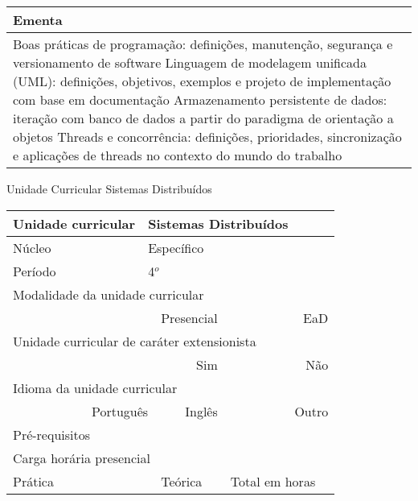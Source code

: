 \begin{quadro}[ht!]
\begin{tabular}{|p{3cm} p{2cm} p{3cm} p{2cm} p{3cm} p{2cm}|}
\multicolumn{6}{|p{15cm}|}{\cellcolor{blue1} Ementa} \\\hline
\hline\multicolumn{6}{|p{15cm}|}{\scriptsize Boas práticas de programação: definições, manutenção, segurança e versionamento de software Linguagem de modelagem unificada (UML): definições, objetivos, exemplos e projeto de implementação com base em documentação Armazenamento persistente de dados: iteração com banco de dados a partir do paradigma de orientação a objetos Threads e concorrência: definições, prioridades, sincronização e aplicações de threads no contexto do mundo do trabalho}\\\hline 
\hline
	\end{tabular}
\end{quadro}


\begin{quadro}[ht!]
  \centering\scriptsize
\caption{Unidade Curricular Sistemas Distribuídos}
\label{unit_19}
\begin{tabular}{|p{3cm} p{2cm} p{3cm} p{2cm} p{3cm} p{2cm}|}\hline
\multicolumn{1}{|p{3cm}|}{\cellcolor{blue1} Unidade curricular} & \multicolumn{5}{p{9cm}|}{Sistemas Distribuídos}\\\hline
\multicolumn{1}{|p{3cm}|}{\cellcolor{blue1} Núcleo} & \multicolumn{5}{p{11.5cm}|}{Específico}\\\hline
\multicolumn{1}{|p{3cm}|}{\cellcolor{blue1} Período} & \multicolumn{5}{p{9cm}|}{4$^o$}\\\hline
\multicolumn{6}{|p{15cm}|}{\cellcolor{blue1} Modalidade da unidade curricular} \\\hline
\multicolumn{2}{|r}{		} &  \multicolumn{2}{r}{Presencial \XBox} & \multicolumn{2}{r|}{EaD \Square	} \\\hline
\multicolumn{6}{|p{15cm}|}{\cellcolor{blue1} Unidade curricular de caráter extensionista} \\\hline
\multicolumn{4}{|r}{			Sim \Square	} & \multicolumn{2}{r|}{	Não \XBox	}\\\hline
\multicolumn{6}{|p{15cm}|}{\cellcolor{blue1} Idioma da unidade curricular} \\ \hline
\multicolumn{2}{|r}{	Português \XBox	} &  \multicolumn{2}{r}{	Inglês \Square	} & \multicolumn{2}{r|}{	Outro \Square	} \\ \hline
\multicolumn{1}{|p{3cm}|}{\cellcolor{blue1} Pré-requisitos} & \multicolumn{5}{p{9cm}|}{}\\ \hline
\multicolumn{6}{|p{15cm}|}{\cellcolor{blue1} Carga horária presencial} \\ \hline
\multicolumn{1}{|p{3cm}|}{\raggedleft Prática} & \multicolumn{1}{p{1cm}|}{\centering	30	} &  \multicolumn{1}{p{3cm}|}{\raggedleft Teórica}  & \multicolumn{1}{p{1cm}|}{\centering 	30	} & \multicolumn{1}{p{3cm}|}{\raggedleft Total em horas} & \multicolumn{1}{p{1cm}|}{\raggedleft	60	} \\ \hline 

\end{tabular}
\end{quadro}
